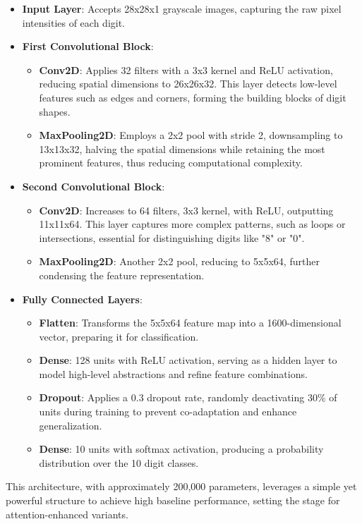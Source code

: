 \documentclass[12pt]{article}
\begin{document}
\begin{itemize}
    \item \textbf{Input Layer}: Accepts 28x28x1 grayscale images, capturing the raw pixel intensities of each digit.
    \item \textbf{First Convolutional Block}:
        \begin{itemize}
            \item \textbf{Conv2D}: Applies 32 filters with a 3x3 kernel and ReLU activation, reducing spatial dimensions to 26x26x32. This layer detects low-level features such as edges and corners, forming the building blocks of digit shapes.
            \item \textbf{MaxPooling2D}: Employs a 2x2 pool with stride 2, downsampling to 13x13x32, halving the spatial dimensions while retaining the most prominent features, thus reducing computational complexity.
        \end{itemize}
    \item \textbf{Second Convolutional Block}:
        \begin{itemize}
            \item \textbf{Conv2D}: Increases to 64 filters, 3x3 kernel, with ReLU, outputting 11x11x64. This layer captures more complex patterns, such as loops or intersections, essential for distinguishing digits like "8" or "0".
            \item \textbf{MaxPooling2D}: Another 2x2 pool, reducing to 5x5x64, further condensing the feature representation.
        \end{itemize}
    \item \textbf{Fully Connected Layers}:
        \begin{itemize}
            \item \textbf{Flatten}: Transforms the 5x5x64 feature map into a 1600-dimensional vector, preparing it for classification.
            \item \textbf{Dense}: 128 units with ReLU activation, serving as a hidden layer to model high-level abstractions and refine feature combinations.
            \item \textbf{Dropout}: Applies a 0.3 dropout rate, randomly deactivating 30\% of units during training to prevent co-adaptation and enhance generalization.
            \item \textbf{Dense}: 10 units with softmax activation, producing a probability distribution over the 10 digit classes.
        \end{itemize}
\end{itemize}
This architecture, with approximately 200,000 parameters, leverages a simple yet powerful structure to achieve high baseline performance, setting the stage for attention-enhanced variants.
\end{document}
